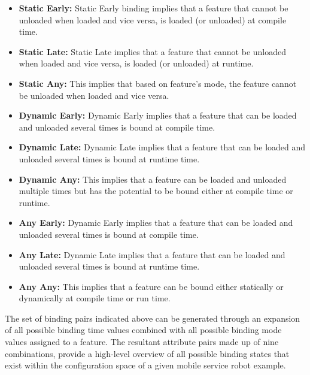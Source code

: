 \documentclass[conference]{IEEEtran}
\begin{document}
\begin{itemize}
    \item \textbf{Static Early: } Static Early binding implies that a feature that cannot be unloaded when loaded and vice versa, is loaded (or unloaded) at compile time. 
    
    \item \textbf{Static Late: } Static Late implies that a feature that cannot be unloaded when loaded and vice versa, is loaded (or unloaded) at runtime.
    
    \item \textbf{Static Any: } This implies that based on feature's mode, the feature cannot be unloaded when loaded and vice versa.  
    
    \item \textbf{Dynamic Early: }Dynamic Early implies that a feature that can be loaded and unloaded several times is bound at compile time.
    
    \item \textbf{Dynamic Late: }Dynamic Late implies that a feature that can be loaded and unloaded several times is bound at runtime time.
    
    \item \textbf{Dynamic Any: } This implies that a feature can be loaded and unloaded multiple times but has the potential to be bound either at compile time or runtime.
    
    \item \textbf{Any Early: }Dynamic Early implies that a feature that can be loaded and unloaded several times is bound at compile time.
    
    \item \textbf{Any Late: }Dynamic Late implies that a feature that can be loaded and unloaded several times is bound at runtime time.
    
    \item \textbf{Any Any: } This implies that a feature can be bound either statically or dynamically at compile time or run time. 
\end{itemize}

The set of binding pairs indicated above can be generated through an expansion of all possible binding time values combined with all possible binding mode values assigned to a feature. The resultant attribute pairs made up of nine combinations, provide a high-level overview of all possible binding states that exist within the configuration space of a given mobile service robot example. 
\end{document}
